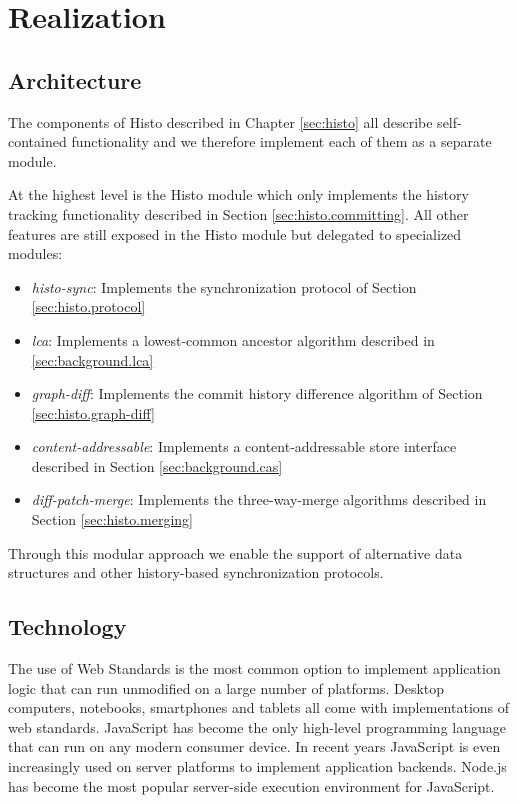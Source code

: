 
\chapter{Realization}
\label{sec:realization}

\section{Architecture}
The components of Histo described in Chapter \ref{sec:histo} all describe self-contained functionality and we therefore implement each of them as a separate module.

At the highest level is the Histo module which only implements the history tracking functionality described in Section \ref{sec:histo.committing}.
All other features are still exposed in the Histo module but delegated to specialized modules:

\begin{itemize}
\item \emph{histo-sync}: Implements the synchronization protocol of Section \ref{sec:histo.protocol}
\item \emph{lca}: Implements a lowest-common ancestor algorithm described in \ref{sec:background.lca}
\item \emph{graph-diff}: Implements the commit history difference algorithm of Section \ref{sec:histo.graph-diff}
\item \emph{content-addressable}: Implements a content-addressable store interface described in Section \ref{sec:background.cas}
\item \emph{diff-patch-merge}: Implements the three-way-merge algorithms described in Section \ref{sec:histo.merging}
\end{itemize}

Through this modular approach we enable the support of alternative data structures and other history-based synchronization protocols.

\section{Technology}
The use of Web Standards is the most common option to implement application logic that can run unmodified on a large number of platforms.
Desktop computers, notebooks, smartphones and tablets all come with implementations of web standards.
JavaScript has become the only high-level programming language that can run on any modern consumer device.
In recent years JavaScript is even increasingly used on server platforms to implement application backends.
Node.js has become the most popular server-side execution environment for JavaScript.\\

